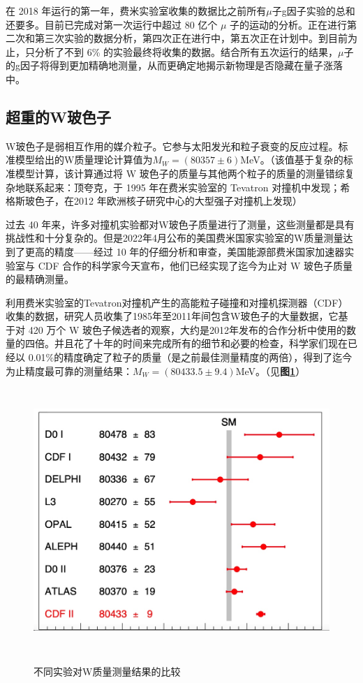 在 2018 年运行的第一年，费米实验室收集的数据比之前所有$\mu$子g因子实验的总和还要多。目前已完成对第一次运行中超过 80 亿个 $\mu$ 子的运动的分析。正在进行第二次和第三次实验的数据分析，第四次正在进行中，第五次正在计划中。到目前为止，只分析了不到 6\% 的实验最终将收集的数据。结合所有五次运行的结果，$\mu$子的g因子将得到更加精确地测量，从而更确定地揭示新物理是否隐藏在量子涨落中。

\subsection{超重的W玻色子}
W玻色子是弱相互作用的媒介粒子。它参与太阳发光和粒子衰变的反应过程。标准模型给出的W质量理论计算值为$M_W=(80357\pm6)$MeV。（该值基于复杂的标准模型计算，该计算通过将 W 玻色子的质量与其他两个粒子的质量的测量错综复杂地联系起来：顶夸克，于 1995 年在费米实验室的 Tevatron 对撞机中发现；希格斯玻色子，在2012 年欧洲核子研究中心的大型强子对撞机上发现）

过去 40 年来，许多对撞机实验都对W玻色子质量进行了测量，这些测量都是具有挑战性和十分复杂的。但是2022年4月公布的美国费米国家实验室的W质量测量达到了更高的精度——经过 10 年的仔细分析和审查，美国能源部费米国家加速器实验室与 CDF 合作的科学家今天宣布，他们已经实现了迄今为止对 W 玻色子质量的最精确测量。

利用费米实验室的Tevatron对撞机产生的高能粒子碰撞和对撞机探测器（CDF）收集的数据，研究人员收集了1985年至2011年间包含W玻色子的大量数据，它基于对 420 万个 W 玻色子候选者的观察，大约是2012年发布的合作分析中使用的数量的四倍。并且花了十年的时间来完成所有的细节和必要的检查，科学家们现在已经以 0.01\%的精度确定了粒子的质量（是之前最佳测量精度的两倍），得到了迄今为止精度最可靠的测量结果：$M_W=(80433.5\pm 9.4)$MeV。（见\textbf{图\ref{fig:1.3}}）
\begin{figure}[H]
 \centering
 \caption{不同实验对W质量测量结果的比较\cite{Wmass}}
 \includegraphics[height=10cm, width=12cm]{pictures/w-boson-comparisons.jpeg}
 \label{fig:1.3}
\end{figure}

